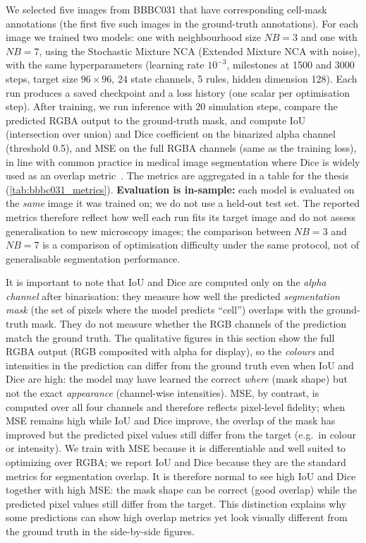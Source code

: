 We selected five images from BBBC031 that have corresponding cell-mask annotations (the first five such images in the ground-truth annotations).
For each image we trained two models: one with neighbourhood size \(NB=3\) and one with \(NB=7\), using the Stochastic Mixture NCA (Extended Mixture NCA with noise), with the same hyperparameters (learning rate \(10^{-3}\), milestones at 1500 and 3000 steps, target size \(96\times96\), 24 state channels, 5 rules, hidden dimension 128).
Each run produces a saved checkpoint and a loss history (one scalar per optimisation step).
After training, we run inference with 20 simulation steps, compare the predicted RGBA output to the ground-truth mask, and compute IoU (intersection over union) and Dice coefficient on the binarized alpha channel (threshold 0.5), and MSE on the full RGBA channels (same as the training loss), in line with common practice in medical image segmentation where Dice is widely used as an overlap metric~\cite{milletari2016v,maierhein2024metrics}.
The metrics are aggregated in a table for the thesis (\cref{tab:bbbc031_metrics}).
\textbf{Evaluation is in-sample:} each model is evaluated on the \emph{same} image it was trained on; we do not use a held-out test set.
The reported metrics therefore reflect how well each run fits its target image and do not assess generalisation to new microscopy images; the comparison between \(NB=3\) and \(NB=7\) is a comparison of optimisation difficulty under the same protocol, not of generalisable segmentation performance.

It is important to note that IoU and Dice are computed only on the \emph{alpha channel} after binarisation: they measure how well the predicted \emph{segmentation mask} (the set of pixels where the model predicts ``cell'') overlaps with the ground-truth mask.
They do not measure whether the RGB channels of the prediction match the ground truth.
The qualitative figures in this section show the full RGBA output (RGB composited with alpha for display), so the \emph{colours} and intensities in the prediction can differ from the ground truth even when IoU and Dice are high: the model may have learned the correct \emph{where} (mask shape) but not the exact \emph{appearance} (channel-wise intensities).
MSE, by contrast, is computed over all four channels and therefore reflects pixel-level fidelity; when MSE remains high while IoU and Dice improve, the overlap of the mask has improved but the predicted pixel values still differ from the target (e.g.\ in colour or intensity).
We train with MSE because it is differentiable and well suited to optimizing over RGBA; we report IoU and Dice because they are the standard metrics for segmentation overlap. It is therefore normal to see high IoU and Dice together with high MSE: the mask shape can be correct (good overlap) while the predicted pixel values still differ from the target.
This distinction explains why some predictions can show high overlap metrics yet look visually different from the ground truth in the side-by-side figures.

